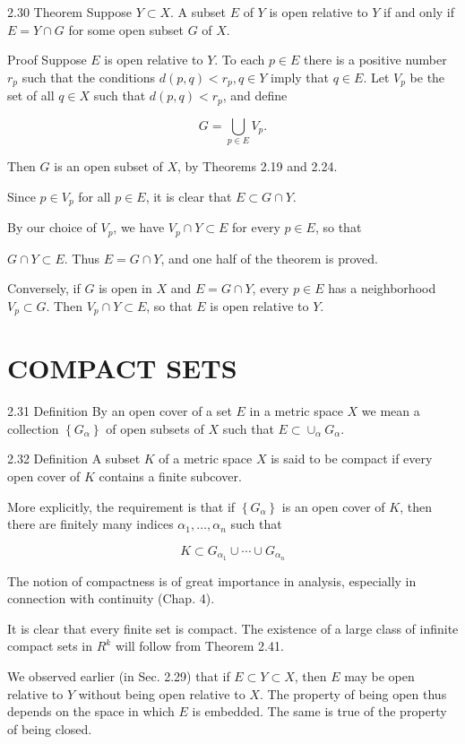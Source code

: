 \documentclass[10pt]{article}
\begin{document}
2.30 Theorem Suppose $Y \subset X$. A subset $E$ of $Y$ is open relative to $Y$ if and only if $E=Y \cap G$ for some open subset $G$ of $X$.

Proof Suppose $E$ is open relative to $Y$. To each $p \in E$ there is a positive number $r_{p}$ such that the conditions $d(p, q)<r_{p}, q \in Y$ imply that $q \in E$. Let $V_{p}$ be the set of all $q \in X$ such that $d(p, q)<r_{p}$, and define

$$
G=\bigcup_{p \in E} V_{p} .
$$

Then $G$ is an open subset of $X$, by Theorems 2.19 and 2.24.

Since $p \in V_{p}$ for all $p \in E$, it is clear that $E \subset G \cap Y$.

By our choice of $V_{p}$, we have $V_{p} \cap Y \subset E$ for every $p \in E$, so that

$G \cap Y \subset E$. Thus $E=G \cap Y$, and one half of the theorem is proved.

Conversely, if $G$ is open in $X$ and $E=G \cap Y$, every $p \in E$ has a neighborhood $V_{p} \subset G$. Then $V_{p} \cap Y \subset E$, so that $E$ is open relative to $Y$.

\section{COMPACT SETS}
2.31 Definition By an open cover of a set $E$ in a metric space $X$ we mean a collection $\left\{G_{\alpha}\right\}$ of open subsets of $X$ such that $E \subset \cup_{\alpha} G_{\alpha}$.

2.32 Definition A subset $K$ of a metric space $X$ is said to be compact if every open cover of $K$ contains a finite subcover.

More explicitly, the requirement is that if $\left\{G_{\alpha}\right\}$ is an open cover of $K$, then there are finitely many indices $\alpha_{1}, \ldots, \alpha_{n}$ such that

$$
K \subset G_{\alpha_{1}} \cup \cdots \cup G_{\alpha_{n}}
$$

The notion of compactness is of great importance in analysis, especially in connection with continuity (Chap. 4).

It is clear that every finite set is compact. The existence of a large class of infinite compact sets in $R^{k}$ will follow from Theorem 2.41.

We observed earlier (in Sec. 2.29) that if $E \subset Y \subset X$, then $E$ may be open relative to $Y$ without being open relative to $X$. The property of being open thus depends on the space in which $E$ is embedded. The same is true of the property of being closed.
\end{document}
